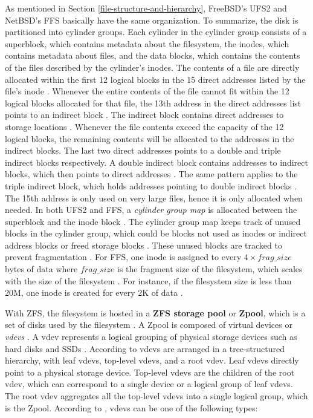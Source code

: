 As mentioned in Section \ref{file-structure-and-hierarchy}, FreeBSD's UFS2 and NetBSD's FFS basically have the same organization. To summarize,
the disk is partitioned into cylinder groups. Each cylinder in the cylinder group consists of a superblock,
which contains metadata about the filesystem, the inodes, which contains metadata about files, and the
data blocks, which contains the contents of the files described by the cylinder's inodes. The contents of
a file are directly allocated within the first 12 logical blocks in the 15 direct addresses listed by the
file's inode \parencite{oracle2010}. Whenever the entire contents of the file cannot fit within the 12
logical blocks allocated for that file, the 13th address in the direct addresses list points to an indirect
block \parencite{oracle2010}. The indirect block contains direct addresses to storage locations \parencite{oracle2010}.
Whenever the file contents exceed the capacity of the 12 logical blocks, the remaining contents will
be allocated to the addresses in the indirect blocks. The last two direct addresses points to a double and triple
indirect blocks respectively. A double indirect block contains addresses to indirect blocks, which then
points to direct addresses \parencite{oracle2010}. The same pattern applies to the triple indirect block,
which holds addresses pointing to double indirect blocks \parencite{oracle2010}. The 15th address is only
used on very large files, hence it is only allocated when needed. In both UFS2 and FFS, a \textit{cylinder group map}
is allocated between the superblock and the inode block \parencite{oracle2010}. The cylinder group map
keeps track of unused blocks in the cylinder group, which could be blocks not used as inodes or indirect address
blocks or freed storage blocks \parencite{oracle2010}. These unused blocks are tracked to prevent fragmentation
\parencite{oracle2010}. For FFS, one inode
is assigned to every $4 \times frag\_size$ bytes of data where $frag\_size$ is the fragment size of the filesystem,
which scales with the size of the filesystem \parencite{netbsd_newfs}. For instance, if
the filesystem size is less than 20M, one inode is created for every 2K of data \parencite{netbsd_newfs}.

With ZFS, the filesystem is hosted in a \textbf{ZFS storage pool} or \textbf{Zpool}, which is a set
of disks used by the filesystem \parencite{data_recovery_glossary}. A Zpool is composed of virtual devices
or \textit{vdevs} \parencite{openzfs_vdev}. A vdev represents a logical grouping of physical storage devices such
as hard disks and SSDs \parencite{openzfs_vdev}. According to \textcite{openzfs_vdev}
vdevs are arranged in a tree-structured hierarchy, with leaf vdevs,
top-level vdevs, and a root vdev. Leaf vdevs directly point to a physical storage device. Top-level vdevs are the
children of the root vdev, which can correspond to a single device or a logical group of leaf vdevs. The root vdev
aggregates all the top-level vdevs into a single logical group, which is the Zpool.
According to \textcite{openzfs_vdev}, vdevs can be one of the following types:

